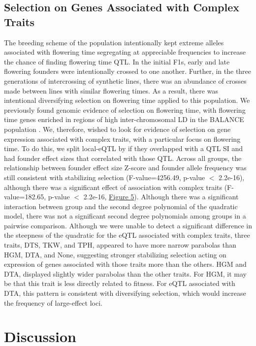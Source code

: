 \documentclass[article,9pt,twocolumn,twoside]{rilabRxiv}
\begin{document}
\subsection{Selection on Genes Associated with Complex Traits}
The breeding scheme of the population intentionally kept extreme alleles associated with flowering time segregating at appreciable frequencies to increase the chance of finding flowering time QTL.
In the initial F1s, early and late flowering founders were intentionally crossed to one another.
Further, in the three generations of intercrossing of synthetic lines, there was an abundance of crosses made between lines with similar flowering times.
As a result, there was intentional diversifying selection on flowering time applied to this population.
We previously found genomic evidence of selection on flowering time, with flowering time genes enriched in regions of high inter-chromosomal LD in the  BALANCE population \citep{Odell}.
We, therefore, wished to look for evidence of selection on gene expression associated with complex traits, with a particular focus on flowering time.
To do this, we split local-eQTL by if they overlapped with a QTL SI and had founder effect sizes that correlated with those QTL.
Across all groups, the relationship between founder effect size Z-score and founder allele frequency was still consistent with stabilizing selection (F-value=4256.49, p-value $<$ 2.2e-16), although there was a significant effect of association with complex traits (F-value=182.65, p-value $<$ 2.2e-16, \hyperref[fig:pheno_frownfigure]{Figure 5}).
Although there was a significant interaction between group and the second degree polynomial of the quadratic model, there was not a significant second degree polynomials among groups in a pairwise comparison.
Although we were unable to detect a significant difference in the steepness of the quadratic for the eQTL associated with complex traits, three traits, DTS, TKW, and TPH, appeared to have more narrow parabolas than HGM, DTA, and None, suggesting stronger stabilizing selection acting on expression of genes associated with those traits more than the others.
HGM and DTA, displayed slightly wider parabolas than the other traits.
For HGM, it may be that this trait is less directly related to fitness.
For eQTL associated with DTA, this pattern is consistent with diversifying selection, which would increase the frequency of large-effect loci.

\section{Discussion}
\end{document}
